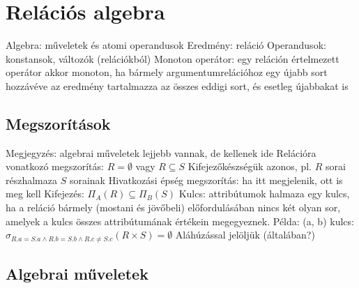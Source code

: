 \documentclass[12pt,a4paper]{article}
\begin{document}
\pagebreak

\section{Relációs algebra}

\begin{outline}
	\1 Algebra: műveletek és atomi operandusok
		\2 Eredmény: reláció
		\2 Operandusok: konstansok, változók (relációkból)
	\1 Monoton operátor: egy reláción értelmezett operátor akkor monoton, ha bármely argumentumrelációhoz egy újabb sort hozzávéve az eredmény tartalmazza az összes eddigi sort, és esetleg újabbakat is
\end{outline}

\subsection{Megszorítások}

\begin{outline}
	\1 Megjegyzés: algebrai műveletek lejjebb vannak, de kellenek ide
	\1 Relációra vonatkozó megszorítás: $R = \emptyset$ vagy $R \subseteq S$
		\2 Kifejezőkészségük azonos, pl. $R$ sorai részhalmaza $S$ sorainak
	\1 Hivatkozási épség megszorítás: ha itt megjelenik, ott is meg kell
		\2 Kifejezés: $\Pi_A(R) \subseteq \Pi_B(S)$
	\1 Kulcs: attribútumok halmaza egy kulcs, ha a reláció bármely (mostani és jövőbeli) előfordulásában nincs két olyan sor, amelyek a kulcs összes attribútumának értékein megegyeznek.
		\2 Példa: (a, b) kulcs: $\sigma_{R.a=S.a \wedge R.b = S.b \wedge R.c \ne S.c}(R\times S) = \emptyset$
		\2 Aláhúzással jelöljük (általában?)
\end{outline}

\pagebreak

\subsection{Algebrai műveletek}
\end{document}
